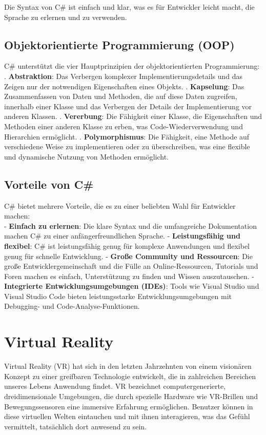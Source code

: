 Die Syntax von C\# ist einfach und klar, was es für Entwickler leicht macht, die Sprache zu erlernen und zu verwenden.
\subsection{Objektorientierte Programmierung (OOP)}

C\# unterstützt die vier Hauptprinzipien der objektorientierten Programmierung:
\\

. \textbf{Abstraktion}: Das Verbergen komplexer Implementierungsdetails und das Zeigen nur der notwendigen Eigenschaften eines Objekts.
. \textbf{Kapselung}: Das Zusammenfassen von Daten und Methoden, die auf diese Daten zugreifen, innerhalb einer Klasse und das Verbergen der Details der Implementierung vor anderen Klassen.
. \textbf{Vererbung}: Die Fähigkeit einer Klasse, die Eigenschaften und Methoden einer anderen Klasse zu erben, was Code-Wiederverwendung und Hierarchien ermöglicht.
. \textbf{Polymorphismus}: Die Fähigkeit, eine Methode auf verschiedene Weise zu implementieren oder zu überschreiben, was eine flexible und dynamische Nutzung von Methoden ermöglicht.
\subsection{Vorteile von C\#}

C\# bietet mehrere Vorteile, die es zu einer beliebten Wahl für Entwickler machen:
\\

\noindent
- \textbf{Einfach zu erlernen}: Die klare Syntax und die umfangreiche Dokumentation machen C\# zu einer anfängerfreundlichen Sprache.
\newline
- \textbf{Leistungsfähig und flexibel}: C\# ist leistungsfähig genug für komplexe Anwendungen und flexibel genug für schnelle Entwicklung.
\newline
- \textbf{Große Community und Ressourcen}: Die große Entwicklergemeinschaft und die Fülle an Online-Ressourcen, Tutorials und Foren machen es einfach, Unterstützung zu finden und Wissen auszutauschen.
\newline
- \textbf{Integrierte Entwicklungsumgebungen (IDEs)}: Tools wie Visual Studio und Visual Studio Code bieten leistungsstarke Entwicklungsumgebungen mit Debugging- und Code-Analyse-Funktionen.
\section{Virtual Reality}
Virtual Reality (VR) hat sich in den letzten Jahrzehnten von einem visionären Konzept zu einer greifbaren Technologie entwickelt, die in zahlreichen Bereichen unseres Lebens Anwendung findet. VR bezeichnet computergenerierte, dreidimensionale Umgebungen, die durch spezielle Hardware wie VR-Brillen und Bewegungssensoren eine immersive Erfahrung ermöglichen. Benutzer können in diese virtuellen Welten eintauchen und mit ihnen interagieren, was das Gefühl vermittelt, tatsächlich dort anwesend zu sein.
\\

